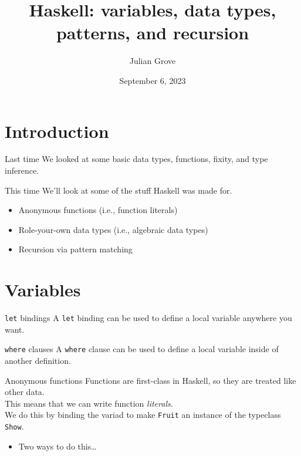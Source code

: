\documentclass[presentation]{beamer}
\author{Julian Grove}
\date{September 6, 2023}
\title{Haskell: variables, data types, patterns, and recursion}
\institute[University of Rochester]{FACTS.lab, University of Rochester}
\begin{document}
\maketitle

\section{Introduction}
\label{sec:org9fb5694}

\begin{frame}[label={sec:orga52ce46}]{Last time}
We looked at some basic data types, functions, fixity, and type inference.
\end{frame}

\begin{frame}[label={sec:org9576599}]{This time}
We'll look at some of the stuff Haskell was made for.
\pause
\begin{itemize}[<+->]
\item Anonymous functions (i.e., function literals)
\item Role-your-own data types (i.e., algebraic data types)
\item Recursion via pattern matching
\end{itemize}
\end{frame}

\section{Variables}
\label{sec:org57238fb}
\begin{frame}[label={sec:org56df7d7},fragile]{\texttt{let} bindings}
 A \texttt{let} binding can be used to define a local variable anywhere you want.
\end{frame}

\begin{frame}[label={sec:org537dab7},fragile]{\texttt{where} clauses}
 A \texttt{where} clause can be used to define a local variable inside of another
definition.
\end{frame}

\begin{frame}[label={sec:orgef068dd},fragile]{Anonymous functions}
 Functions are first-class in Haskell, so they are treated like other data. \\[0pt]
\pause \bigskip
This means that we can write function \emph{literals}. \\[0pt]
\pause \bigskip
We do this by binding the variad to make \texttt{Fruit} an instance of the typeclass \texttt{Show}.
\begin{itemize}
\item Two ways to do this\ldots{}
\end{itemize}
\end{frame}
\end{document}
